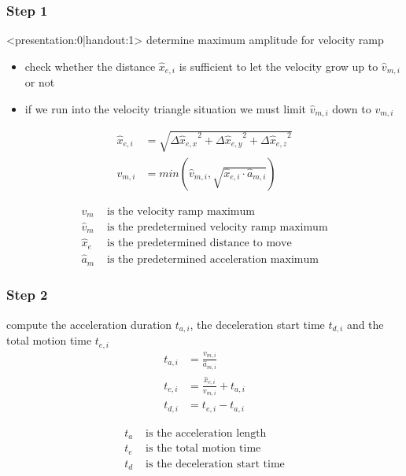 \documentclass[%
  professionalfonts,%
  xcolor={%
    usenames,%
    dvipsnames,%
    svgnames,%
    table,%
    hyperref%
  }%
]{beamer}
\begin{document}
\subsubsection{Step 1}
\begin{frame}<presentation:0|handout:1>
determine maximum amplitude for velocity ramp
\begin{itemize}
\item check whether the distance $\hat{x}_{e,i}$ is sufficient to let the velocity grow up to $\hat{v}_{m,i}$ or not
\item if we run into the velocity triangle situation we must limit $\hat{v}_{m,i}$ down to $v_{m,i}$
\end{itemize}
\end{frame}

\begin{frame}
\begin{align}
\hat{x}_{e,i} & = \sqrt{{\Delta\hat{x}_{e,x}}^{2} + {\Delta\hat{x}_{e,y}}^{2} + {\Delta\hat{x}_{e,z}}^{2} } \\
v_{m,i } & = min(\hat{v}_{m,i},\sqrt{\hat{x}_{e,i} \cdot \hat{a}_{m,i}})  \label{eq:asynvmi}
\end{align}

\begin{align*}
v_{m} & \text{ is the velocity ramp maximum} \\
\hat{v}_{m} & \text{ is the predetermined velocity ramp maximum} \\
\hat{x}_{e} & \text{ is the predetermined distance to move} \\
\hat{a}_{m} & \text{ is the predetermined acceleration maximum} 
\end{align*}
\end{frame}

\subsubsection{Step 2}
\begin{frame}
compute the acceleration duration $t_{a,i}$, the deceleration start time $t_{d,i}$ and the total motion time $t_{e,i}$
\begin{align}
t_{a,i} & = \frac{v_{m,i}}{\hat{a}_{m,i}} \\
t_{e,i} & = \frac{\hat{x}_{e,i}}{v_{m,i}} + t_{a,i} \\
t_{d,i} & = t_{e,i} - t_{a,i}
\end{align}

\begin{align*}
t_{a} & \text{ is the acceleration length} \\
t_{e} & \text{ is the total motion time} \\
t_{d} & \text{ is the deceleration start time}
\end{align*}
\end{frame}
  
\end{document}
